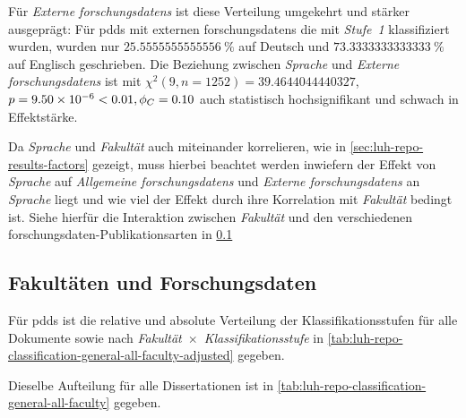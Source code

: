 Für \textit{Externe \glspl{forschungsdaten}} ist diese Verteilung umgekehrt und stärker ausgeprägt:
Für \glspl{pdd} mit externen \glspl{forschungsdaten} die mit \textit{Stufe~1} klassifiziert wurden, wurden nur $\SI[round-mode=places,round-precision=2]{25,5555555555556}{\percent}$ auf Deutsch und $\SI[round-mode=places,round-precision=2]{73,3333333333333}{\percent}$ auf Englisch geschrieben.
Die Beziehung zwischen \textit{Sprache} und \textit{Externe \glspl{forschungsdaten}} ist mit $\chi^2 (\num{9}, n=\num{1252}) = \num[round-mode=places,round-precision=2]{39.4644044440327}$, $p = \num[round-mode=places,round-precision=2]{9.49823708731411E-06}<\num{0.01},\phi_C=\num[round-mode=places,round-precision=2]{0.102503804500984}$ auch statistisch hochsignifikant und schwach in Effektstärke.

Da \textit{Sprache} und \textit{Fakultät} auch miteinander korrelieren, wie in \cref{sec:luh-repo-results-factors} gezeigt, muss hierbei beachtet werden inwiefern der Effekt von \textit{Sprache} auf \textit{Allgemeine \glspl{forschungsdaten}} und \textit{Externe \glspl{forschungsdaten}} an \textit{Sprache} liegt und wie viel der Effekt durch ihre Korrelation mit \textit{Fakultät} bedingt ist.
Siehe hierfür die Interaktion zwischen \textit{Fakultät} und den verschiedenen \gls{forschungsdaten}-Publikationsarten in \cref{sec:luh-repo-results-faculties}

\subsection{Fakultäten und Forschungsdaten}\label{sec:luh-repo-results-faculties}
Für \glspl{pdd} ist die relative und absolute Verteilung der Klassifikationsstufen für alle Dokumente sowie nach \textit{Fakultät}~$\times$~\textit{Klassifikationsstufe} in \cref{tab:luh-repo-classification-general-all-faculty-adjusted} gegeben.
\begin{table}[!htbp]
	\caption{\gls{forschungsdaten}-Klassifizierung der \glspl{pdd} aus der Stichprobe nach \textit{Fakultät}~$\times$~\textit{Klassifikationsstufe} aufgegliedert.
    Angabe relativ zu der respektiven Gesamtanzahl für \textit{Fakultät}.
    Absolute Werte in Klammern angegeben.}
    
    \label{tab:luh-repo-classification-general-all-faculty-adjusted}
\end{table}
Dieselbe Aufteilung für alle Dissertationen ist in \cref{tab:luh-repo-classification-general-all-faculty} gegeben.

